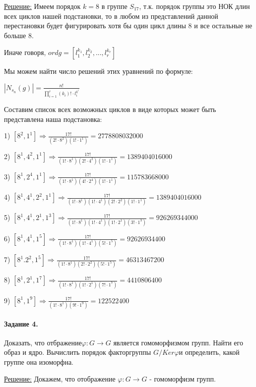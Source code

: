\documentclass[utf8,14pt,a4paper,oneside,russian]{book}
\begin{document}
	\underline{Решение:} Имеем порядок $k=8$ в группе $S_{17}$, т.к. порядок группы это НОК длин всех циклов нашей подстановки, то в любом из представлений данной перестановки будет фигурировать хотя бы один цикл длины 8 и все остальные не больше 8.
	
	Иначе говоря, $ord g=[l_{1}^{k_{1}},l_{2}^{k_{2}},...,l_{r}^{k_{r}}]$ 
	
	Мы можем найти число решений этих уравнений по формуле:
	
	
	$|N_{s_{n}}(g)|=\frac{n!}{\prod_{i=1}^{r}(k_{i})! \cdot l_{i}^{k^{i}}}$
	
	Составим список всех возможных циклов в виде которых может быть представлена наша подстановка:
	
	1) $[8^{2},1^{1}] \Rightarrow\frac{17!}{(2! \cdot 8^{2})(1! \cdot 1^{1})}=2778808032000$
	
	2) $[8^{1},4^{2},1^{1}]\Rightarrow\frac{17!}{(1! \cdot 8^{1})(2! \cdot 4^{2})(1! \cdot 1^{1})}=1389404016000$
	
	3) $[8^{1},2^{4},1^{1}]\Rightarrow\frac{17!}{(1! \cdot 8^{1})(4! \cdot 2^{4})(1! \cdot 1^{1})}=115783668000$
	
	4) $[8^{1},4^{1},2^{2},1^{1}]\Rightarrow\frac{17!}{(1! \cdot 8^{1})(1! \cdot 4^{1})(2! \cdot 2^{2})(1! \cdot 1^{1})}=1389404016000$
	
	5) $[8^{1},4^{1},2^{1},1^{3}]\Rightarrow\frac{17!}{(1! \cdot 8^{1})(1! \cdot 4^{1})(1! \cdot 2^{1})(3! \cdot 1^{3})}=926269344000$
	
	6) $[8^{1},4^{1},1^{5}]\Rightarrow\frac{17!}{(1! \cdot 8^{1})(1! \cdot 4^{1})(5! \cdot 1^{5})}=92626934400$
	
	7) $[8^{1}.2^{2},1^{5}]\Rightarrow\frac{17!}{(1! \cdot 8^{1})(2! \cdot 2^{2})(5! \cdot 1^{5})}=46313467200$
	
	8) $[8^{1},2^{1},1^{7}]\Rightarrow\frac{17!}{(1! \cdot 8^{1})(1! \cdot 2^{1})(7! \cdot 1^{7})}=4410806400$
	
	9) $[8^{1},1^{9}]\Rightarrow\frac{17!}{(1! \cdot 8^{1})(9! \cdot 1^{9})}=122522400$
	
	\paragraph*{Задание 4.} Доказать, что отбражение$\varphi:G\rightarrow G$ является гомоморфизмом групп. Найти его образ и ядро. Вычислить порядок факторгруппы $G/Ker\varphi$и определить, какой группе она изоморфна.
	
	\underline{Решение:} Докажем, что отображение $\varphi:G \rightarrow G$ - гомоморфизм групп.
	
\end{document}
